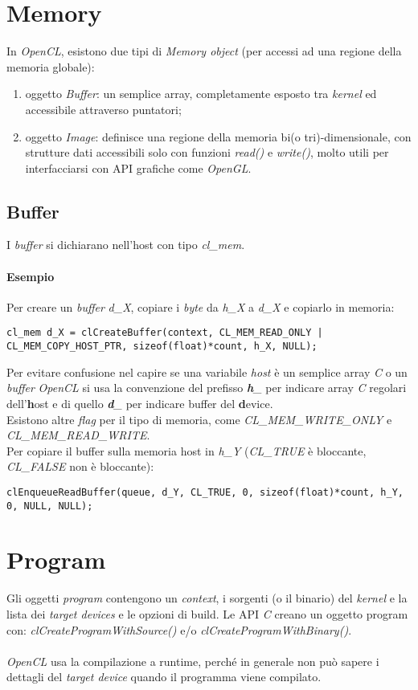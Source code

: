 \section{Memory}
In \textit{OpenCL}, esistono due tipi di \textit{Memory object} (per accessi ad una regione della memoria globale):
\begin{enumerate}
	\item oggetto \textit{Buffer}: un semplice array, completamente esposto tra \textit{kernel} ed accessibile attraverso puntatori;
	\item oggetto \textit{Image}: definisce una regione della memoria bi(o tri)-dimensionale, con strutture dati accessibili solo con funzioni \textit{read()} e \textit{write()}, molto utili per interfacciarsi con API grafiche come \textit{OpenGL}.
\end{enumerate}
\subsection{Buffer}
I \textit{buffer} si dichiarano nell'host con tipo \textit{cl\_mem}.
\paragraph{Esempio}
Per creare un \textit{buffer} \textit{d\_X}, copiare i \textit{byte} da \textit{h\_X} a \textit{d\_X} e copiarlo in memoria:
\begin{lstlisting}
cl_mem d_X = clCreateBuffer(context, CL_MEM_READ_ONLY | CL_MEM_COPY_HOST_PTR, sizeof(float)*count, h_X, NULL);
\end{lstlisting}
Per evitare confusione nel capire se una variabile \textit{host} è un semplice array \textit{C} o un \textit{buffer} \textit{OpenCL} si usa la convenzione del prefisso \textit{\textbf{h}\_} per indicare array \textit{C} regolari dell'\textbf{h}ost e di quello \textit{\textbf{d}\_} per indicare buffer del \textbf{d}evice. \\
Esistono altre \textit{flag} per il tipo di memoria, come \textit{CL\_MEM\_WRITE\_ONLY} e \textit{CL\_MEM\_READ\_WRITE}. \\
Per copiare il buffer sulla memoria host in \textit{h\_Y} (\textit{CL\_TRUE} è bloccante, \textit{CL\_FALSE} non è bloccante):
\begin{lstlisting}
clEnqueueReadBuffer(queue, d_Y, CL_TRUE, 0, sizeof(float)*count, h_Y, 0, NULL, NULL);
\end{lstlisting}

\section{Program}
Gli oggetti \textit{program} contengono un \textit{context}, i sorgenti (o il binario) del \textit{kernel} e la lista dei \textit{target devices} e le opzioni di build. Le API \textit{C} creano un oggetto program con: \textit{clCreateProgramWithSource()} e/o \textit{clCreateProgramWithBinary()}. \\\\
\textit{OpenCL} usa la compilazione a runtime, perché in generale non può sapere i dettagli del \textit{target device} quando il programma viene compilato.
